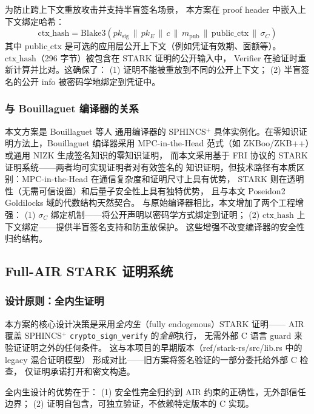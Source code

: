 \documentclass[11pt,a4paper]{ctexart}
\begin{document}
为防止跨上下文重放攻击并支持半盲签名场景，
本方案在 proof header 中嵌入上下文绑定哈希：
\begin{equation}
  \mathrm{ctx\_hash} = \mathrm{Blake3}(pk_{\mathrm{sig}} \,\|\, pk_E \,\|\, c \,\|\, m_{\mathrm{pub}} \,\|\, \mathrm{public\_ctx} \,\|\, \sigma_C)
\end{equation}
其中 $\mathrm{public\_ctx}$ 是可选的应用层公开上下文（例如凭证有效期、面额等）。
$\mathrm{ctx\_hash}$（296 字节）被包含在 STARK 证明的公开输入中，
Verifier 在验证时重新计算并比对。这确保了：
(1) 证明不能被重放到不同的公开上下文；
(2) 半盲签名的公开 info 被密码学地绑定到凭证中。

\subsubsection{与 Bouillaguet 编译器的关系}

本文方案是 Bouillaguet 等人 \cite{Bouillaguet2026BlindingPH} 通用编译器的
SPHINCS$^+$ 具体实例化。在零知识证明方法上，Bouillaguet 编译器采用
MPC-in-the-Head 范式（如 ZKBoo/ZKB++）或通用 NIZK 生成签名知识的零知识证明，
而本文采用基于 FRI 协议的 STARK 证明系统——两者均可实现证明者对有效签名的
知识证明，但技术路径有本质区别：MPC-in-the-Head 在通信复杂度和证明尺寸上具有优势，
STARK 则在透明性（无需可信设置）和后量子安全性上具有独特优势，
且与本文 Poseidon2 Goldilocks 域的代数结构天然契合。
与原始编译器相比，本文增加了两个工程增强：
(1) $\sigma_C$ 绑定机制——将公开声明以密码学方式绑定到证明；
(2) $\mathrm{ctx\_hash}$ 上下文绑定——提供半盲签名支持和防重放保护。
这些增强不改变编译器的安全性归约结构。

\subsection{Full-AIR STARK 证明系统}

\subsubsection{设计原则：全内生证明}

本方案的核心设计决策是采用\emph{全内生}（fully endogenous）STARK 证明——
AIR 覆盖 SPHINCS$^+$ \texttt{crypto\_sign\_verify} 的\emph{全部}执行，
无需外部 C 语言 guard 来验证证明之外的任何条件。
这与本项目的早期版本（ref/stark-rs/src/lib.rs 中的 legacy 混合证明模型）
形成对比——旧方案将签名验证的一部分委托给外部 C 检查，
仅证明承诺打开和密文构造。

全内生设计的优势在于：
(1) 安全性完全归约到 AIR 约束的正确性，无外部信任边界；
(2) 证明自包含，可独立验证，不依赖特定版本的 C 实现。
\end{document}
